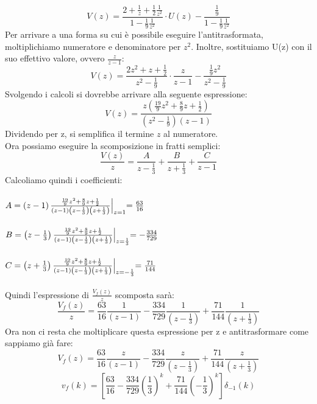 \documentclass[12pt,a4paper]{article}
\begin{document}
\begin{enumerate}
			\[
				V(z) = \frac{2+\frac{1}{z} + \frac{1}{2}\frac{1}{z^2}}{1-\frac{1}{9}\frac{1}{z^2}}\cdot U(z) - \frac{\frac{1}{9}}{1-\frac{1}{9}\frac{1}{z^2}}
			\]
			Per arrivare a una forma su cui è possibile eseguire l'antitrasformata, moltiplichiamo numeratore e denominatore per $z^2$. Inoltre, sostituiamo U(z) con il suo effettivo valore, ovvero $\frac{z}{z-1}$:
			\[
				V(z) = \frac{2z^2 + z + \frac{1}{2}}{z^2 -\frac{1}{9}}\cdot\frac{z}{z-1} - \frac{\frac{1}{9}z^2}{z^2-\frac{1}{9}}
			\]
			Svolgendo i calcoli si dovrebbe arrivare alla seguente espressione:
			\[
				V(z) = \frac{z\left(\frac{19}{9}z^2 + \frac{8}{9}z + \frac{1}{2}\right)}{\left(z^2 - \frac{1}{9}\right)\left(z-1\right)}
			\]
			Dividendo per z, si semplifica il termine $z$ al numeratore.\\
			Ora possiamo eseguire la scomposizione in fratti semplici:
			\[
				\frac{V(z)}{z} = \frac{A}{z-\frac{1}{3}} + \frac{B}{z+\frac{1}{3}} + \frac{C}{z-1}
			\]
			Calcoliamo quindi i coefficienti:\\ \\
			$A=\left(z-1\right)\frac{\frac{19}{9}z^2 + \frac{8}{9}z + \frac{1}{2}}{\left(z-1\right)\left(z-\frac{1}{3}\right)\left(z+\frac{1}{3}\right)}\Bigl\lvert_{z=1} = \frac{63}{16}$\\ \\
			$B = \left(z-\frac{1}{3}\right)\frac{\frac{19}{9}z^2 + \frac{8}{9}z + \frac{1}{2}}{\left(z-1\right)\left(z-\frac{1}{3}\right)\left(z+\frac{1}{3}\right)}\Bigl\lvert_{z=\frac{1}{3}} = -\frac{334}{729}$ \\ \\
			$C=\left(z+\frac{1}{3}\right)\frac{\frac{19}{9}z^2 + \frac{8}{9}z + \frac{1}{2}}{\left(z-1\right)\left(z-\frac{1}{3}\right)\left(z+\frac{1}{3}\right)}\Bigl\lvert_{z=-\frac{1}{3}} = \frac{71}{144}$	\\ \\
			Quindi l'espressione di $\frac{V_f(z)}{z}$ scomposta sar\`a:
			\[
				\frac{V_f(z)}{z} = \frac{63}{16}\frac{1}{\left(z-1\right)} - \frac{334}{729}\frac{1}{\left(z-\frac{1}{3}\right)} + \frac{71}{144}\frac{1}{\left(z+\frac{1}{3}\right)}
			\]
			Ora non ci resta che moltiplicare questa espressione per z e antitrasformare come sappiamo gi\`a fare:
			\[
				V_f(z) = \frac{63}{16}\frac{z}{\left(z-1\right)} - \frac{334}{729}\frac{z}{\left(z-\frac{1}{3}\right)} + \frac{71}{144}\frac{z}{\left(z+\frac{1}{3}\right)}
			\]
			\[
				v_f(k) = \left[\frac{63}{16} - \frac{334}{729}\left(\frac{1}{3}\right)^k + \frac{71}{144}\left(-\frac{1}{3}\right)^k\right]\delta_{-1}(k)
			\]
	\end{enumerate}
	\newpage
\end{document}
